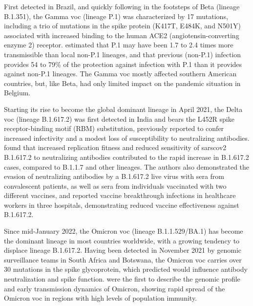 First detected in Brazil, and quickly following in the footsteps of Beta (lineage B.1.351), the Gamma \gls{voc} (lineage P.1) was characterized by 17 mutations, including a trio of mutations in the spike protein (K417T, E484K, and N501Y) associated with increased binding to the human ACE2 (angiotensin-converting enzyme 2) receptor.
\citet{faria2021genomics} estimated that P.1 may have been 1.7 to 2.4 times more transmissible than local non-P.1 lineages, and that previous (non-P.1) infection provides 54 to 79\% of the protection against infection with P.1 than it provides against non-P.1 lineages.
The Gamma \gls{voc} mostly affected southern American countries, but, like Beta, had only limited impact on the pandemic situation in Belgium.

Starting its rise to become the global dominant lineage in April 2021, the Delta \gls{voc} (lineage B.1.617.2) was first detected in India and bears the L452R spike receptor-binding motif (RBM) substitution, previously reported to confer increased infectivity and a modest loss of susceptibility to neutralizing antibodies.
\citet{mlcochova2021sars-cov-2} found that increased replication fitness and reduced sensitivity of \gls{sarscov2} B.1.617.2 to neutralizing antibodies contributed to the rapid increase in B.1.617.2 cases, compared to B.1.1.7 and other lineages.
The authors also demonstrated the evasion of neutralizing antibodies by a B.1.617.2 live virus with sera from convalescent patients, as well as sera from individuals vaccinated with two different vaccines, and reported vaccine breakthrough infections in healthcare workers in three hospitals, demonstrating reduced vaccine effectiveness against B.1.617.2.

Since mid-January 2022, the Omicron \gls{voc} (lineage B.1.1.529/BA.1) has become the dominant lineage in most countries worldwide, with a growing tendency to displace lineage B.1.617.2.
Having been detected in November 2021 by genomic surveillance teams in South Africa and Botswana, the Omicron \gls{voc} carries over 30 mutations in the spike glycoprotein, which \citet{martin2022selection} predicted would influence antibody neutralization and spike function.
\citet{viana2022rapid} were the first to describe the genomic profile and early transmission dynamics of Omicron, showing rapid spread of the Omicron \gls{voc} in regions with high levels of population immunity.

